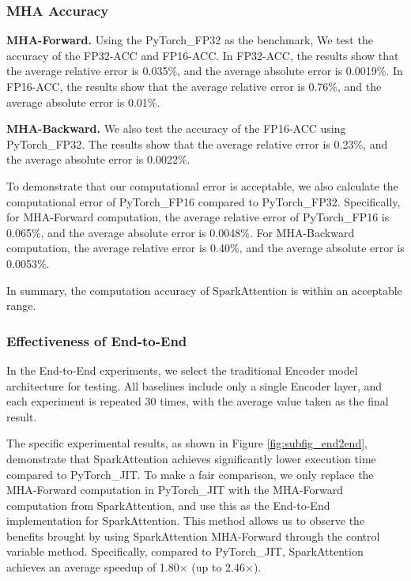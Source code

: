 \documentclass[10pt,twocolumn]{article}
\begin{document}
\subsubsection{MHA Accuracy} \label{subsec:mha_accuracy}
\textbf{MHA-Forward.}
Using the PyTorch\_FP32 as the benchmark, We test the accuracy of the FP32-ACC and FP16-ACC. 
In FP32-ACC, the results show that the average relative error is 0.035\%, and the average absolute error is 0.0019\%.
In FP16-ACC, the results show that the average relative error is 0.76\%, and the average absolute error is 0.01\%.


\noindent\textbf{MHA-Backward.}
We also test the accuracy of the FP16-ACC using PyTorch\_FP32.
The results show that the average relative error is 0.23\%, and the average absolute error is 0.0022\%.

To demonstrate that our computational error is acceptable, we also calculate the computational error of PyTorch\_FP16 compared to PyTorch\_FP32.
Specifically, for MHA-Forward computation, the average relative error of PyTorch\_FP16 is 0.065\%, and the average absolute error is 0.0048\%. For MHA-Backward computation, the average relative error is 0.40\%, and the average absolute error is 0.0053\%.


In summary, the computation accuracy of SparkAttention is within an acceptable range.


\subsubsection{Effectiveness of End-to-End} \label{subsec:EndtoEnd}
In the End-to-End experiments, we select the traditional Encoder model architecture for testing.
All baselines include only a single Encoder layer, and each experiment is repeated 30 times, with the average value taken as the final result.

The specific experimental results, as shown in Figure \ref{fig:subfig_end2end}, demonstrate that SparkAttention achieves significantly lower execution time compared to PyTorch\_JIT.
To make a fair comparison, we only replace the MHA-Forward computation in PyTorch\_JIT with the MHA-Forward computation from SparkAttention, and use this as the End-to-End implementation for SparkAttention. 
This method allows us to observe the benefits brought by using SparkAttention MHA-Forward through the control variable method.
Specifically, compared to PyTorch\_JIT, SparkAttention achieves an average speedup of 1.80$\times$ (up to 2.46$\times$).
\end{document}
